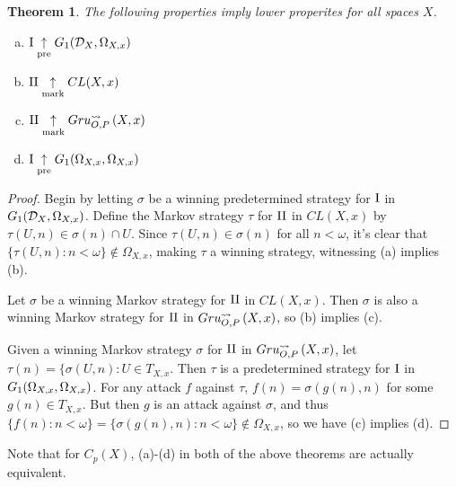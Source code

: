 \documentclass[11pt]{article}
\theoremstyle{plain}
\newtheorem{theorem}{Theorem}
\theoremstyle{definition}
\theoremstyle{remark}
\theoremstyle{plain}
\theoremstyle{definition}
\theoremstyle{remark}
\begin{document}
\begin{theorem}
The following properties imply lower properites for all spaces \(X\).
\begin{enumerate}[a)]
\item \(\mathrm{I}\underset{\text{pre}}{\uparrow}G_{1}(\mathcal{D}_X,\Omega_{X,x})\)
\item \(\mathrm{II}\underset{\text{mark}}{\uparrow} CL(X,x)\)
\item \(\mathrm{II}\underset{\text{mark}}{\uparrow}Gru_{O,P}^{\leadsto}\left({X},{x}\right)\)
\item \(\mathrm{I}\underset{\text{pre}}{\uparrow}G_{1}(\Omega_{X,x},\Omega_{X,x})\)
\end{enumerate}
\end{theorem}
\begin{proof}
Begin by letting \(\sigma\) be a winning predetermined strategy for
\(\mathrm{I}\) in \(G_{1}(\mathcal{D}_X,\Omega_{X,x})\).
Define the Markov strategy \(\tau\) for \(\mathrm{II}\) in \(CL(X,x)\)
by \(\tau(U,n)\in\sigma(n)\cap U\).
Since \(\tau(U,n)\in\sigma(n)\) for all \(n<\omega\),
it's clear that \(\{\tau(U,n):n<\omega\}\not\in\Omega_{X,x}\),
making \(\tau\) a winning strategy, witnessing (a) implies (b).

Let \(\sigma\) be a winning Markov strategy for \(\mathrm{II}\) in
\(CL(X,x)\). Then \(\sigma\) is also a winning Markov strategy
for \(\mathrm{II}\) in \(Gru_{O,P}^{\leadsto}\left({X},{x}\right)\), so (b) implies (c).

Given a winning Markov strategy \(\sigma\) for \(\mathrm{II}\) in
\(Gru_{O,P}^{\leadsto}\left({X},{x}\right)\), let 
\(\tau(n)=\{\sigma(U,n):U\in T_{X,x}\).
Then \(\tau\) is a predetermined strategy for \(\mathrm{I}\) in
\(G_{1}(\Omega_{X,x},\Omega_{X,x})\).
For any attack \(f\) against \(\tau\),
\(f(n)=\sigma(g(n),n)\) for some \(g(n)\in T_{X,x}\).
But then \(g\) is an attack against \(\sigma\), and
thus \(\{f(n):n<\omega\}=\{\sigma(g(n),n):n<\omega\}\not\in\Omega_{X,x}\),
so we have (c) implies (d).
\end{proof}

Note that for \(C_p(X)\), (a)-(d) in both of the above theorems
are actually equivalent.
\end{document}

